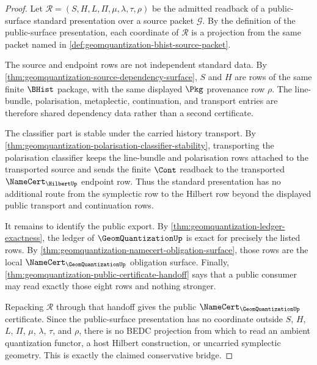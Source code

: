 \begin{proof}
Let $\mathcal{R}=(S,H,L,\Pi,\mu,\lambda,\tau,\rho)$ be the admitted readback of a public-surface standard presentation over a source packet $\mathcal{G}$. By the definition of the public-surface presentation, each coordinate of $\mathcal{R}$ is a projection from the same packet named in \autoref{def:geomquantization-bhist-source-packet}.

The source and endpoint rows are not independent standard data. By \autoref{thm:geomquantization-source-dependency-surface}, $S$ and $H$ are rows of the same finite $\BHist$ package, with the same displayed $\Pkg$ provenance row $\rho$. The line-bundle, polarisation, metaplectic, continuation, and transport entries are therefore shared dependency data rather than a second certificate.

The classifier part is stable under the carried history transport. By \autoref{thm:geomquantization-polarisation-classifier-stability}, transporting the polarisation classifier keeps the line-bundle and polarisation rows attached to the transported source and sends the finite $\Cont$ readback to the transported $\NameCert_{\HilbertUp}$ endpoint row. Thus the standard presentation has no additional route from the symplectic row to the Hilbert row beyond the displayed public transport and continuation rows.

It remains to identify the public export. By \autoref{thm:geomquantization-ledger-exactness}, the ledger of $\GeomQuantizationUp$ is exact for precisely the listed rows. By \autoref{thm:geomquantization-namecert-obligation-surface}, those rows are the local $\NameCert_{\GeomQuantizationUp}$ obligation surface. Finally, \autoref{thm:geomquantization-public-certificate-handoff} says that a public consumer may read exactly those eight rows and nothing stronger.

Repacking $\mathcal{R}$ through that handoff gives the public $\NameCert_{\GeomQuantizationUp}$ certificate. Since the public-surface presentation has no coordinate outside $S$, $H$, $L$, $\Pi$, $\mu$, $\lambda$, $\tau$, and $\rho$, there is no BEDC projection from which to read an ambient quantization functor, a host Hilbert construction, or uncarried symplectic geometry. This is exactly the claimed conservative bridge.
\end{proof}
